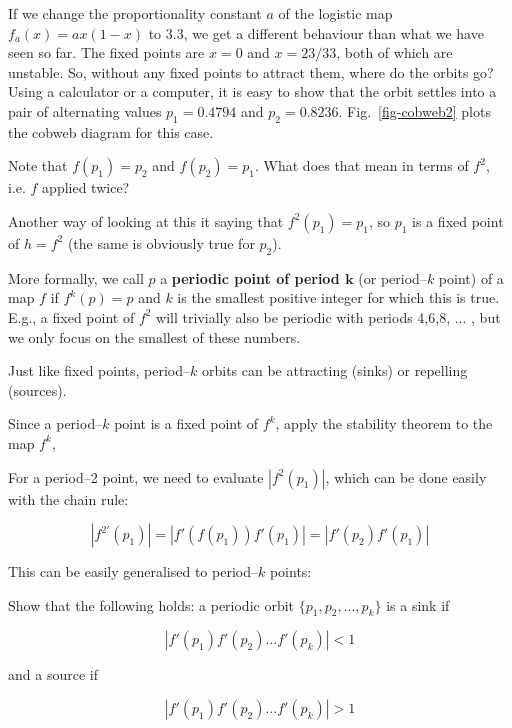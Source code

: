 If we change the proportionality constant $a$ of the logistic map $f_a(x)=ax(1-x)$ to 3.3, we get a different behaviour than what we have seen so far. The fixed points are $x=0$ and $x=23/33$, both of which are unstable. So, without any fixed points to attract them, where do the orbits go? Using a calculator or a computer, it is easy to show that the orbit settles into a pair of alternating values $p_1=0.4794$ and $p_2=0.8236$. Fig.~\ref{fig-cobweb2} plots the cobweb diagram for this case.

\begin{cue}
Note that $f(p_1)=p_2$ and $f(p_2)=p_1$. What does that mean in terms of $f^2$, i.e. $f$ applied twice?
\end{cue}

Another way of looking at this it saying that $f^2(p_1)=p_1$, so $p_1$ is a fixed point of $h=f^2$ (the same is obviously true for $p_2$).

More formally, we call $p$ a \textbf{periodic point of period $\mathbf k$} (or period--$k$ point) of a map $f$ if $f^k(p)=p$ and $k$ is the smallest positive integer for which this is true. E.g., a fixed point of $f^2$ will trivially also be periodic with periods 4,6,8, ... , but we only focus on the smallest of these numbers.

Just like fixed points, period--$k$ orbits can be attracting (sinks) or repelling (sources).

\begin{cue}
Since a period--$k$ point is a fixed point of $f^k$, apply the stability theorem to the map $f^k$,
\end{cue}

For a period--2 point, we need to evaluate $|f^2(p_1)|$, which can be done easily with the chain rule:

\begin{equation}
|f^{2'}(p_1)| = |f'(f(p_1)) f'(p_1)| = |f'(p_2) f'(p_1)|
\end{equation}  

This can be easily generalised to period--$k$ points:

\begin{exer}
Show that the following holds: a periodic orbit $\{p_1, p_2, ..., p_k\}$ is a sink if

$$|f'(p_1) f'(p_2) ... f'(p_k)| < 1$$

and a source if

$$|f'(p_1) f'(p_2) ... f'(p_k)| > 1$$

\end{exer}


